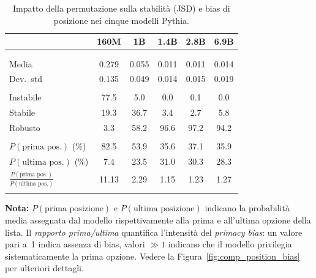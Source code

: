 \documentclass[../relazione.tex]{subfiles}
\begin{document}
\small
\setlength{\LTcapwidth}{\textwidth}
\begin{xltabular}{\textwidth}{X *{5}{c}}
\toprule
 & \textbf{160M} & \textbf{1B} & \textbf{1.4B} & \textbf{2.8B} & \textbf{6.9B} \\
\midrule
  \\
  \\
 \hspace{1em}Media & 0.279 & 0.055 & 0.011 & 0.011 & 0.014 \\
 \hspace{1em}Dev.\ std & 0.135 & 0.049 & 0.014 & 0.015 & 0.019 \\
\midrule
{}  \\
 \hspace{1em}Instabile & 77.5 & 5.0 & 0.0 & 0.1 & 0.0 \\
 \hspace{1em}Stabile & 19.3 & 36.7 & 3.4 & 2.7 & 5.8 \\
 \hspace{1em}Robusto & 3.3 & 58.2 & 96.6 & 97.2 & 94.2 \\
\midrule
{}  \\
 \hspace{1em}$P(\text{prima pos.})$ (\%) & 82.5 & 53.9 & 35.6 & 37.1 & 35.9 \\
 \hspace{1em}$P(\text{ultima pos.})$ (\%) & 7.4 & 23.5 & 31.0 & 30.3 & 28.3 \\
 \hspace{1em}$\frac{P(\text{prima pos.})}{P(\text{ultima pos.})}$ & 11.13 & 2.29 & 1.15 & 1.23 & 1.27 \\
\bottomrule
\caption{Impatto della permutazione sulla stabilità (JSD) e bias di posizione nei cinque modelli Pythia.}
\label{tab:comparison_5models_permutation}
\end{xltabular}
\normalsize
\textbf{Nota:} {$P(\text{prima posizione})$ e $P(\text{ultima posizione})$ indicano la probabilità media assegnata dal modello rispettivamente alla prima e all'ultima opzione della lista. Il \emph{rapporto prima/ultima} quantifica l'intensità del \textit{primacy bias}: un valore pari a~1 indica assenza di bias, valori $\gg 1$ indicano che il modello privilegia sistematicamente la prima opzione. Vedere la Figura~\ref{fig:comp_position_bias} per ulteriori dettagli.}
\end{document}
